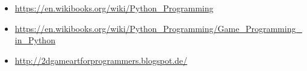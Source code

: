 \begin{itemize}
	\item \url{https://en.wikibooks.org/wiki/Python_Programming}
	\item \url{https://en.wikibooks.org/wiki/Python_Programming/Game_Programming_in_Python}
	\item \url{http://2dgameartforprogrammers.blogspot.de/}
\end{itemize}
